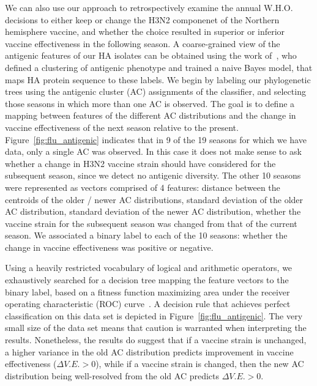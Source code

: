 \documentclass[a4paper,11pt]{article}
\begin{document}
We can also use our approach to retrospectively examine the annual W.H.O. decisions to either keep or change the H3N2 componenet of the Northern hemisphere vaccine, and whether the choice resulted in superior or inferior vaccine effectiveness in the following season.
A coarse-grained view of the antigenic features of our HA isolates can be obtained using the work of~\cite{du2012mapping}, who defined a clustering of antigenic phenotype and trained a naive Bayes model, that maps HA protein sequence to these labels.
We begin by labeling our phylogenetic trees using the antigenic cluster (AC) assignments of the classifier, and selecting those seasons in which more than one AC is observed.
The goal is to define a mapping between features of the different AC distributions and the change in vaccine effectiveness of the next season relative to the present.
Figure~\ref{fig:flu_antigenic} indicates that in 9 of the 19 seasons for which we have data, only a single AC was observed.
In this case it does not make sense to ask whether a change in H3N2 vaccine strain should have considered for the subsequent season, since we detect no antigenic diversity.
The other 10 seasons were represented as vectors comprised of 4 features: distance between the centroids of the older / newer AC distributions, standard deviation of the older AC distribution, standard deviation of the newer AC distribution, whether the vaccine strain for the subsequent season was changed from that of the current season.
We associated a binary label to each of the 10 seasons: whether the change in vaccine effectiveness was positive or negative.

Using a heavily restricted vocabulary of logical and arithmetic operators, we exhaustively searched for a decision tree mapping the feature vectors to the binary label, based on a fitness function maximizing area under the receiver operating characteristic (ROC) curve~\cite{schmidt2009distilling}.
A decision rule that achieves perfect classification on this data set is depicted in Figure~\ref{fig:flu_antigenic}.
The very small size of the data set means that caution is warranted when interpreting the results.
Nonetheless, the results do suggest that if a vaccine strain is unchanged, a higher variance in the old AC distribution predicts improvement in vaccine effectiveness ($\Delta V.E. > 0$), while if a vaccine strain is changed, then the new AC distribution being well-resolved from the old AC predicts $\Delta V.E. > 0$.
\end{document}

